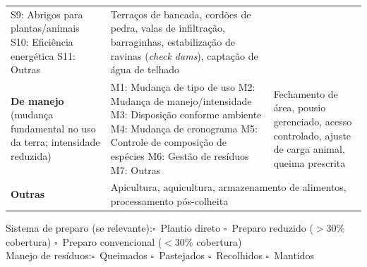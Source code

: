 \begin{table}[htbp]
\begin{tabular}{p{3cm}p{4cm}p{7cm}}
  S9: Abrigos para plantas/animais \newline
  S10: Eficiência energética \newline
  S11: Outras &
  Terraços de bancada, cordões de pedra, valas de infiltração, barraginhas, estabilização de ravinas (\textit{check dams}), captação de água de telhado \\
\addlinespace
\textbf{De manejo} \newline
(mudança fundamental no uso da terra; intensidade reduzida) &
  M1: Mudança de tipo de uso \newline
  M2: Mudança de manejo/intensidade \newline
  M3: Disposição conforme ambiente \newline
  M4: Mudança de cronograma \newline
  M5: Controle de composição de espécies \newline
  M6: Gestão de resíduos \newline
  M7: Outras &
  Fechamento de área, pousio gerenciado, acesso controlado, ajuste de carga animal, queima prescrita \\
\addlinespace
\textbf{Outras} &
  \multicolumn{2}{p{11cm}}{Apicultura, aquicultura, armazenamento de alimentos, processamento pós-colheita} \\
\bottomrule
\end{tabular}
\end{table}

\noindent Sistema de preparo (se relevante):\quad $\square$~Plantio direto \quad $\square$~Preparo reduzido ($>$30\% cobertura) \quad $\square$~Preparo convencional ($<$30\% cobertura)\\
Manejo de resíduos:\quad $\square$~Queimados \quad $\square$~Pastejados \quad $\square$~Recolhidos \quad $\square$~Mantidos

